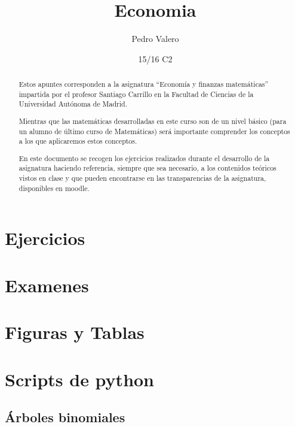 \documentclass{apuntes}
\title{Economia}
\author{Pedro Valero}
\date{15/16 C2}
\begin{document}
\pagestyle{plain}

\begin{abstract}
Estos apuntes corresponden a la asignatura ``Economía y finanzas matemáticas'' impartida por el profesor Santiago Carrillo en la Facultad de Ciencias de la Universidad Autónoma de Madrid.

Mientras que las matemáticas desarrolladas en este curso son de un nivel básico (para un alumno de último curso de Matemáticas) será importante comprender los conceptos a los que aplicaremos estos conceptos.

En este documento se recogen los ejercicios realizados durante el desarrollo de la asignatura haciendo referencia, siempre que sea necesario, a los contenidos teóricos vistos en clase y que pueden encontrarse en las transparencias de la asignatura, disponibles en moodle.
\end{abstract}

\maketitle

\tableofcontents
\newpage

\appendix



%

\chapter{Ejercicios}


\chapter{Examenes}


\chapter{Figuras y Tablas}


\chapter{Scripts de python}
\section{Árboles binomiales}\label{sec:arbolBin}





\printindex
\end{document}
